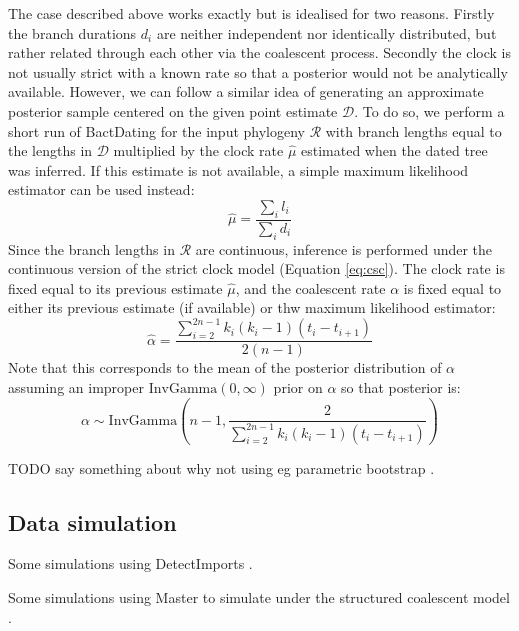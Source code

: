 \documentclass{article}
\begin{document}
The case described above works exactly but is idealised for two reasons.
Firstly the branch durations $d_i$ are neither independent nor identically distributed,
but rather related through each other via the coalescent process. Secondly
the clock is not usually strict with a known rate so that
a posterior would not be analytically available. 
However, we can follow
a similar idea of generating an approximate posterior sample centered on the given
point estimate $\mathcal{D}$. To do so, we perform a short run of BactDating \citep{Didelot2018}
for the input phylogeny $\mathcal{R}$ 
with branch lengths equal to
the lengths in $\mathcal{D}$ multiplied by the clock rate 
$\hat \mu$ estimated when the dated tree was inferred. 
If this estimate is not available, a simple maximum likelihood
estimator can be used instead: 
\begin{equation}
\hat \mu = \frac{\sum_i l_i}{\sum_i d_i}
\end{equation}
Since the branch lengths in $\mathcal{R}$ are continuous, 
inference is performed under the 
continuous version of the strict clock model (Equation \ref{eq:csc}).  
The clock rate is fixed equal to its previous estimate $\hat \mu$, and the coalescent rate $\alpha$
is fixed equal to either its previous estimate (if available) or
thw maximum likelihood estimator:
\begin{equation}
\hat \alpha = \frac{\sum_{i=2}^{2n-1}k_i (k_i-1)(t_i-t_{i+1})}{2(n-1)}
\end{equation}
Note that this corresponds to the mean of the posterior distribution of $\alpha$ 
assuming an improper $\mathrm{InvGamma}(0,\infty)$ prior on $\alpha$ so that posterior is:
\begin{equation}
\alpha \sim \mathrm{InvGamma}\left(n-1, \frac{2}{\sum_{i=2}^{2n-1}k_i (k_i-1)(t_i-t_{i+1})}\right)
\end{equation}

TODO say something about why not using eg 
parametric bootstrap \citep{efronBayesianInferenceParametric2012}.

\subsection*{Data simulation}

Some simulations using DetectImports \citep{Didelot2022detectimports}.

Some simulations using Master \citep{Vaughan2013} to simulate under the structured coalescent model \citep{Nordborg1997}.
\end{document}
